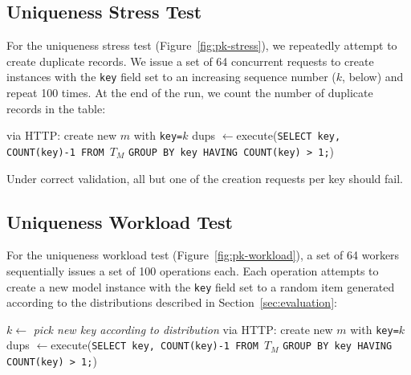 \subsection{Uniqueness Stress Test}
\label{sec:appendix-uniqueness-stress}

For the uniqueness stress test (Figure~\ref{fig:pk-stress}), we repeatedly attempt to create duplicate records. We issue a set of 64 concurrent requests to create instances with the \texttt{key} field set to an increasing sequence number ($k$, below) and repeat 100 times. At the end of the run, we count the number of duplicate records in the table:\vspace{-1em}
\begin{algorithm}[H]
\begin{algorithmic}
      \State via HTTP: create new $m$ with \texttt{key=$k$}
     \EndParFor
   \EndFor
   \State dups $\gets $execute(\texttt{SELECT key, COUNT(key)-1 FROM $T_M$}
   \State \hspace{6.5em}\texttt{GROUP BY key HAVING COUNT(key) > 1;})
\EndFor
\end{algorithmic}
\end{algorithm}\vspace{-1em}
Under correct validation, all but one of the creation requests per key should fail.

\subsection{Uniqueness Workload Test}
\label{sec:appendix-uniqueness-workload}

For the uniqueness workload test (Figure~\ref{fig:pk-workload}), a set of 64 workers sequentially issues a set of 100 operations each. Each operation attempts to create a new model instance with the \texttt{key} field set to a random item generated according to the distributions described in Section~\ref{sec:evaluation}:\vspace{-1em}
\begin{algorithm}[H]
\begin{algorithmic}
      \State $k \gets$ \textit{pick new key according to distribution}
      \State via HTTP: create new $m$ with \texttt{key=$k$}
     \EndFor
   \EndParFor
   \State dups $\gets $execute(\texttt{SELECT key, COUNT(key)-1 FROM $T_M$}
   \State \hspace{6.5em}\texttt{GROUP BY key HAVING COUNT(key) > 1;})
\EndFor
\end{algorithmic}
\end{algorithm}

